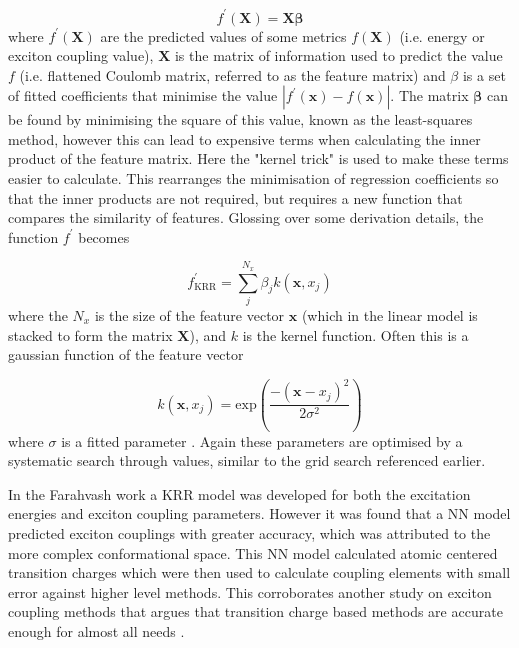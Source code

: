 \begin{equation}
	f^\prime\left(\mathbf{X}\right) = \mathbf{X} \mathbf{\beta}
\end{equation}
%
where $f^\prime\left(\mathbf{X}\right)$ are the predicted values of some metrics $f\left(\mathbf{X}\right)$ 
(i.e. \Qy energy or exciton coupling value), $\mathbf{X}$ is the matrix of information
used to predict the value $f$ (i.e. flattened Coulomb matrix, referred to as the feature
matrix) and $\beta$ is a set of fitted coefficients that minimise the value $\left\lvert f^\prime \left( \mathbf{x}\right) - f \left(\mathbf{x}\right)\right\rvert$.
The matrix $\mathbf{\beta}$ can be found by minimising the square of this value, 
known as the least-squares method, however this can lead to expensive terms when
calculating the inner product of the feature matrix. Here the "kernel trick" is 
used to make these terms easier to calculate. This rearranges the minimisation of
regression coefficients so that the inner products are not required, but requires 
a new function that compares the similarity of features. Glossing over some derivation
details, the function $f^\prime$ becomes

\begin{equation}
	f_{\text{KRR}}^\prime = \sum^{N_x}_j \beta_j k\left(\mathbf{x}, x_j\right)
\end{equation}
%
where the $N_x$ is the size of the feature vector $\mathbf{x}$ (which in the linear
model is stacked to form the matrix $\mathbf{X}$), and $k$ is the kernel function.
Often this is a gaussian function of the feature vector

\begin{equation}
	k\left(\mathbf{x}, x_j\right) = \text{exp}\left(\frac{-\left(\mathbf{x}-x_j\right)^2}{2\sigma^2}\right)
\end{equation}
%
where $\sigma$ is a fitted parameter \cite{Rasmussen2006}. Again these parameters 
are optimised by a systematic search through values, similar to the grid search
referenced earlier.

In the Farahvash work a KRR model was developed for both the excitation energies
and exciton coupling parameters. However it was found that a NN model predicted 
exciton couplings with greater accuracy, which was attributed to the more complex 
conformational space. This NN model calculated atomic centered transition charges 
which were then used to calculate coupling elements with small error against higher 
level methods. This corroborates another study on exciton coupling methods that
argues that transition charge based methods are accurate enough for almost all needs \cite{Kenny2016}.

